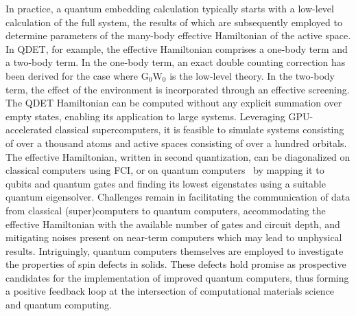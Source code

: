 In practice, a quantum embedding calculation typically starts with a low-level calculation of the full system, the results of which are subsequently employed to determine parameters of the many-body effective Hamiltonian of the active space. In QDET, for example, the effective Hamiltonian comprises a one-body term and a two-body term. In the one-body term, an exact double counting correction has been derived for the case where G$_0$W$_0$ is the low-level theory. In the two-body term, the effect of the environment is incorporated through an effective screening. The QDET Hamiltonian can be computed without any explicit summation over empty states, enabling its application to large systems. Leveraging GPU-accelerated classical supercomputers, it is feasible to simulate systems consisting of over a thousand atoms and active spaces consisting of over a hundred orbitals. The effective Hamiltonian, written in second quantization, can be diagonalized on classical computers using FCI, or on quantum computers~\cite{ma_quantum_2020,rungger_dynamical_2020,keen_quantum-classical_2020,kawashima_optimizing_2021,yao_gutzwiller_2021,tilly_reduced_2021,vorwerk_quantum_2022,huang_simulating_2022,huang_quantum_2023} by mapping it to qubits and quantum gates and finding its lowest eigenstates using a suitable quantum eigensolver.
%
Challenges remain in facilitating the communication of data from classical (super)computers to quantum computers, accommodating the effective Hamiltonian with the available number of gates and circuit depth, and mitigating noises present on near-term computers which may lead to unphysical results. Intriguingly, quantum computers themselves are employed to investigate the properties of spin defects in solids. These defects hold promise as prospective candidates for the implementation of improved quantum computers, thus forming a positive feedback loop at the intersection of computational materials science and quantum computing.



